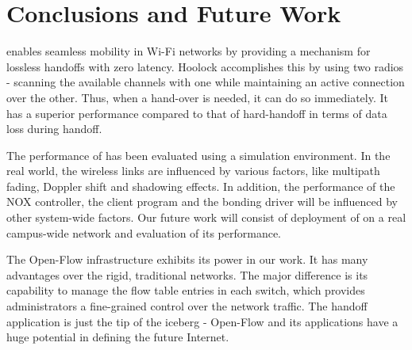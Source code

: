 \section{Conclusions and Future Work}\label{conc}

\sys{} enables seamless mobility in Wi-Fi networks by providing a mechanism for lossless handoffs with zero latency. 
Hoolock accomplishes this by using two radios - scanning the available channels with one while 
maintaining an active connection over the other. Thus, when a hand-over is needed, it can do so immediately.
It has a superior performance compared to that of hard-handoff in terms of data loss during handoff. 

The performance of \sys{} has been evaluated using a simulation environment. 
In the real world, the wireless links are influenced by various factors, 
like multipath fading, Doppler shift and shadowing effects. 
In addition, the performance of the NOX controller, the client program and the bonding 
driver will be influenced by other system-wide factors. 
Our future work will consist of deployment of \sys{} on a real campus-wide network
and evaluation of its performance.

The Open-Flow infrastructure exhibits its power in our work. It has many advantages 
over the rigid, traditional networks. The major difference is its capability to 
manage the flow table entries in each switch, which provides administrators a
fine-grained control over the network traffic. The handoff 
application is just the tip of the iceberg - Open-Flow and its applications have 
a huge potential in defining the future Internet.

